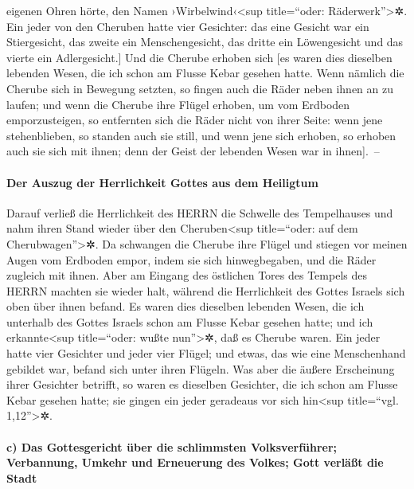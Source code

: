 eigenen Ohren hörte, den Namen ›Wirbelwind‹\textless sup title=``oder:
Räderwerk''\textgreater✲. Ein jeder von den Cheruben
hatte vier Gesichter: das eine Gesicht war ein Stiergesicht, das zweite
ein Menschengesicht, das dritte ein Löwengesicht und das vierte ein
Adlergesicht.{]} Und die Cherube erhoben sich {[}es waren
dies dieselben lebenden Wesen, die ich schon am Flusse Kebar gesehen
hatte. Wenn nämlich die Cherube sich in Bewegung setzten,
so fingen auch die Räder neben ihnen an zu laufen; und wenn die Cherube
ihre Flügel erhoben, um vom Erdboden emporzusteigen, so entfernten sich
die Räder nicht von ihrer Seite: wenn jene stehenblieben,
so standen auch sie still, und wenn jene sich erhoben, so erhoben auch
sie sich mit ihnen; denn der Geist der lebenden Wesen war in
ihnen{]}.~--

\hypertarget{der-auszug-der-herrlichkeit-gottes-aus-dem-heiligtum}{%
\paragraph{Der Auszug der Herrlichkeit Gottes aus dem
Heiligtum}\label{der-auszug-der-herrlichkeit-gottes-aus-dem-heiligtum}}

Darauf verließ die Herrlichkeit des HERRN die Schwelle
des Tempelhauses und nahm ihren Stand wieder über den
Cheruben\textless sup title=``oder: auf dem Cherubwagen''\textgreater✲.
Da schwangen die Cherube ihre Flügel und stiegen vor
meinen Augen vom Erdboden empor, indem sie sich hinwegbegaben, und die
Räder zugleich mit ihnen. Aber am Eingang des östlichen Tores des
Tempels des HERRN machten sie wieder halt, während die Herrlichkeit des
Gottes Israels sich oben über ihnen befand. Es waren dies
dieselben lebenden Wesen, die ich unterhalb des Gottes Israels schon am
Flusse Kebar gesehen hatte; und ich erkannte\textless sup title=``oder:
wußte nun''\textgreater✲, daß es Cherube waren. Ein jeder
hatte vier Gesichter und jeder vier Flügel; und etwas, das wie eine
Menschenhand gebildet war, befand sich unter ihren Flügeln.
Was aber die äußere Erscheinung ihrer Gesichter betrifft,
so waren es dieselben Gesichter, die ich schon am Flusse Kebar gesehen
hatte; sie gingen ein jeder geradeaus vor sich hin\textless sup
title=``vgl. 1,12''\textgreater✲.

\hypertarget{c-das-gottesgericht-uxfcber-die-schlimmsten-volksverfuxfchrer-verbannung-umkehr-und-erneuerung-des-volkes-gott-verluxe4uxdft-die-stadt}{%
\paragraph{c) Das Gottesgericht über die schlimmsten Volksverführer;
Verbannung, Umkehr und Erneuerung des Volkes; Gott verläßt die
Stadt}\label{c-das-gottesgericht-uxfcber-die-schlimmsten-volksverfuxfchrer-verbannung-umkehr-und-erneuerung-des-volkes-gott-verluxe4uxdft-die-stadt}}

